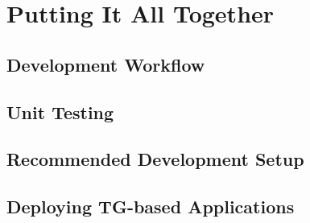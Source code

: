 \chapter{Putting It All Together}\label{ch:08}

\section{Development Workflow}

\section{Unit Testing}

\section{Recommended Development Setup}

\section{Deploying TG-based Applications}